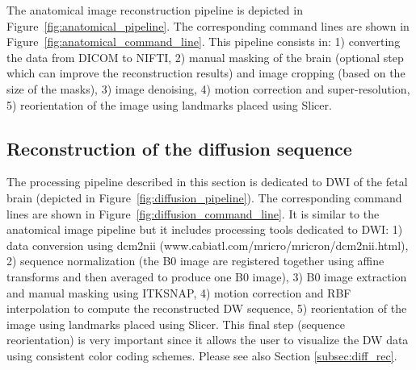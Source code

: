   \begin{figure*}[!h]
   \caption{Command lines corresponding to the processing pipeline for anatomical data in BTK. On the left are shown the blocks used in the anatomical data pipeline (Figure~\ref{fig:anatomical_pipeline}) and on the right the correspond command lines.}
   \label{fig:anatomical_command_line}
 \end{figure*}
 

The anatomical image reconstruction pipeline is depicted in Figure~\ref{fig:anatomical_pipeline}. The corresponding command lines are shown in Figure~\ref{fig:anatomical_command_line}. This pipeline consists in: 1) converting the data from DICOM to NIFTI, 2) manual masking of the brain (optional step which can improve the reconstruction results) and image cropping (based on the size of the masks), 3) image denoising, 4) motion correction and super-resolution, 5) reorientation of the image using landmarks placed using Slicer. 

\subsection{Reconstruction of the diffusion sequence}

The processing pipeline described in this section is dedicated to DWI of the fetal brain (depicted in Figure~\ref{fig:diffusion_pipeline}). The corresponding command lines are shown in Figure~\ref{fig:diffusion_command_line}. It is similar to the anatomical image pipeline but it includes processing tools dedicated to DWI: 1) data conversion using dcm2nii (www.cabiatl.com/mricro/mricron/dcm2nii.html), 2) sequence normalization (the B0 image are registered together using affine transforms and then averaged to produce one B0 image), 3) B0 image extraction and manual masking using ITKSNAP, 4) motion correction and RBF interpolation to compute the reconstructed DW sequence, 5) reorientation of the image using landmarks placed using Slicer. This final step (sequence reorientation) is very important since it allows the user to visualize the DW data using consistent color coding schemes. Please see also Section \ref{subsec:diff_rec}. 

  \begin{figure*}[!h]
   \caption{Overview of the processing pipeline for diffusion data in BTK. dcm2nii is used to convert the DICOM data to NIFTI format and Slicer for the placement of landmarks on which is based the reorientation of the 3D reconstructed image. ITKSNAP (www.itksnap.org) is used to create a rough mask of the brain.}
   \label{fig:diffusion_pipeline}
 \end{figure*}

